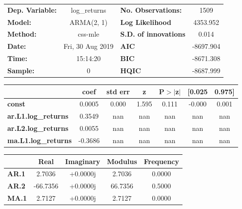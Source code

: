 \begin{center}
\begin{tabular}{lclc}
\toprule
\textbf{Dep. Variable:}     &        log\_returns       & \textbf{  No. Observations:  } &            1509            \\
\textbf{Model:}             &         ARMA(2, 1)        & \textbf{  Log Likelihood     } &          4353.952          \\
\textbf{Method:}            &          css-mle          & \textbf{  S.D. of innovations} &           0.014            \\
\textbf{Date:}              &      Fri, 30 Aug 2019     & \textbf{  AIC                } &         -8697.904          \\
\textbf{Time:}              &          15:14:20         & \textbf{  BIC                } &         -8671.308          \\
\textbf{Sample:}            &             0             & \textbf{  HQIC               } &         -8687.999          \\
\bottomrule
\end{tabular}
\begin{tabular}{lcccccc}
                            & \textbf{coef} & \textbf{std err} & \textbf{z} & \textbf{P$> |$z$|$} & \textbf{[0.025} & \textbf{0.975]}  \\
\midrule
\textbf{const}              &       0.0005  &        0.000     &     1.595  &         0.111        &       -0.000    &        0.001     \\
\textbf{ar.L1.log\_returns} &       0.3549  &          nan     &       nan  &           nan        &          nan    &          nan     \\
\textbf{ar.L2.log\_returns} &       0.0055  &          nan     &       nan  &           nan        &          nan    &          nan     \\
\textbf{ma.L1.log\_returns} &      -0.3686  &          nan     &       nan  &           nan        &          nan    &          nan     \\
\bottomrule
\end{tabular}
\begin{tabular}{lcccc}
              & \textbf{            Real} & \textbf{         Imaginary} & \textbf{         Modulus} & \textbf{        Frequency}  \\
\midrule
\textbf{AR.1} &                2.7036     &                +0.0000j     &                2.7036     &                0.0000       \\
\textbf{AR.2} &              -66.7356     &                +0.0000j     &               66.7356     &                0.5000       \\
\textbf{MA.1} &                2.7127     &                +0.0000j     &                2.7127     &                0.0000       \\
\bottomrule
\end{tabular}
\end{center}
